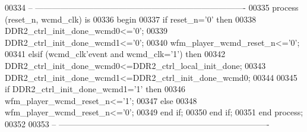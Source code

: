 \begin{DoxyCode}
00334 \textcolor{keyword}{-- ----------------------------------------------------------------------------}
00335 \textcolor{keywordflow}{process} (reset_n, wcmd_clk) \textcolor{keywordflow}{is} 
00336 \textcolor{vhdlkeyword}{begin }
00337     \textcolor{keywordflow}{if} \textcolor{vhdlchar}{reset_n}\textcolor{vhdlchar}{=}\textcolor{vhdlchar}{'}\textcolor{vhdllogic}{}\textcolor{vhdllogic}{0}\textcolor{vhdlchar}{'} \textcolor{keywordflow}{then} 
00338         \textcolor{vhdlchar}{DDR2_ctrl_init_done_wcmd0}\textcolor{vhdlchar}{<=}\textcolor{vhdlchar}{'}\textcolor{vhdllogic}{}\textcolor{vhdllogic}{0}\textcolor{vhdlchar}{'};
00339         \textcolor{vhdlchar}{DDR2_ctrl_init_done_wcmd1}\textcolor{vhdlchar}{<=}\textcolor{vhdlchar}{'}\textcolor{vhdllogic}{}\textcolor{vhdllogic}{0}\textcolor{vhdlchar}{'};
00340         \textcolor{vhdlchar}{wfm_player_wcmd_reset_n}\textcolor{vhdlchar}{<=}\textcolor{vhdlchar}{'}\textcolor{vhdllogic}{}\textcolor{vhdllogic}{0}\textcolor{vhdlchar}{'};
00341     \textcolor{keywordflow}{elsif} \textcolor{vhdlchar}{(}\textcolor{vhdlchar}{wcmd_clk}\textcolor{vhdlchar}{'}\textcolor{vhdlkeyword}{event} \textcolor{keywordflow}{and} \textcolor{vhdlchar}{wcmd_clk}\textcolor{vhdlchar}{=}\textcolor{vhdlchar}{'}\textcolor{vhdllogic}{}\textcolor{vhdllogic}{1}\textcolor{vhdlchar}{'}\textcolor{vhdlchar}{)} \textcolor{keywordflow}{then} 
00342         \textcolor{vhdlchar}{DDR2_ctrl_init_done_wcmd0}\textcolor{vhdlchar}{<=}\textcolor{vhdlchar}{DDR2_ctrl_local_init_done};
00343         \textcolor{vhdlchar}{DDR2_ctrl_init_done_wcmd1}\textcolor{vhdlchar}{<=}\textcolor{vhdlchar}{DDR2_ctrl_init_done_wcmd0};
00344         
00345         \textcolor{keywordflow}{if} \textcolor{vhdlchar}{DDR2_ctrl_init_done_wcmd1}\textcolor{vhdlchar}{=}\textcolor{vhdlchar}{'}\textcolor{vhdllogic}{}\textcolor{vhdllogic}{1}\textcolor{vhdlchar}{'} \textcolor{keywordflow}{then} 
00346             \textcolor{vhdlchar}{wfm_player_wcmd_reset_n}\textcolor{vhdlchar}{<=}\textcolor{vhdlchar}{'}\textcolor{vhdllogic}{}\textcolor{vhdllogic}{1}\textcolor{vhdlchar}{'};
00347         \textcolor{keywordflow}{else} 
00348             \textcolor{vhdlchar}{wfm_player_wcmd_reset_n}\textcolor{vhdlchar}{<=}\textcolor{vhdlchar}{'}\textcolor{vhdllogic}{}\textcolor{vhdllogic}{0}\textcolor{vhdlchar}{'};
00349         \textcolor{keywordflow}{end} \textcolor{keywordflow}{if};
00350     \textcolor{keywordflow}{end} \textcolor{keywordflow}{if};         
00351 \textcolor{keywordflow}{end} \textcolor{keywordflow}{process};
00352 
00353 \textcolor{keyword}{-- ----------------------------------------------------------------------------}

\end{DoxyCode}
